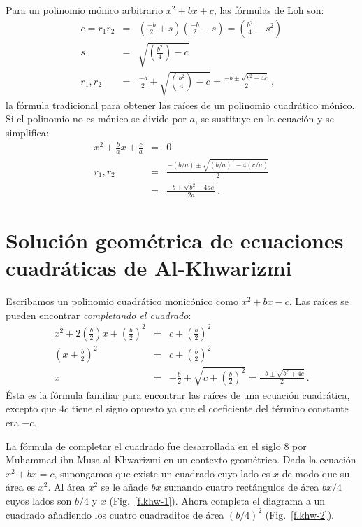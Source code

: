Para un polinomio mónico arbitrario $x^2+bx+c$, las fórmulas de Loh son:
\begin{eqnarray*}
c=r_1r_2&=&\left(\frac{-b}{2}+s\right)  \left(\frac{-b}{2}-s\right)=\left(\frac{b^2}{4}-s^2\right)\\
s&=&\sqrt{\left(\frac{b^2}{4}\right)-c}\\
r_1,r_2&=&\frac{-b}{2}\pm\sqrt{\left(\frac{b^2}{4}\right)-c}=\frac{-b\pm\sqrt{b^2-4c}}{2}\,,
\end{eqnarray*}
la fórmula tradicional para obtener las raíces de un polinomio cuadrático mónico. Si el polinomio no es mónico se divide por $a$, se sustituye en la ecuación y se simplifica:
\begin{eqnarray*}
x^2+\frac{b}{a}x+\frac{c}{a}&=&0\\
r_1,r_2&=&\frac{-(b/a)\pm\sqrt{(b/a)^2-4(c/a)}}{2}\\
&=&\frac{-b\pm\sqrt{b^2-4ac}}{2a}\,.
\end{eqnarray*}

\section{Solución geométrica de ecuaciones cuadráticas de Al-Khwarizmi}\label{s.khwar}

Escribamos un polinomio cuadrático monicónico como $x^2+bx-c$. Las raíces se pueden encontrar \emph{completando el cuadrado}:
\begin{eqnarray*}
x^2+2\left(\frac{b}{2}\right)x+\left(\frac{b}{2}\right)^2&=&c+\left(\frac{b}{2}\right)^2\\
\left(x+\frac{b}{2}\right)^2&=&c+\left(\frac{b}{2}\right)^2\\
x&=&-\frac{b}{2}\pm\sqrt{c+\left(\frac{b}{2}\right)^2}=
\frac{-b\pm\sqrt{b^2+4c}}{2}\,.
\end{eqnarray*}
Ésta es la fórmula familiar para encontrar las raíces de una ecuación cuadrática, excepto que $4c$ tiene el signo opuesto ya que el coeficiente del término constante era $-c$.

La fórmula de completar el cuadrado fue desarrollada en el siglo $8$ por Muhammad ibn Musa al-Khwarizmi en un contexto geométrico. Dada la ecuación $x^2+bx=c$, supongamos que existe un cuadrado cuyo lado es 
$x$ de modo que su área es $x^2$.
Al área $x^2$ se le añade $bx$ sumando cuatro rectángulos de área $bx/4$ cuyos lados son $b/4$ y $x$ (Fig.~\ref{f.khw-1}). Ahora completa el diagrama a un cuadrado añadiendo los cuatro cuadraditos de área $(b/4)^2$ (Fig.~\ref{f.khw-2}).

